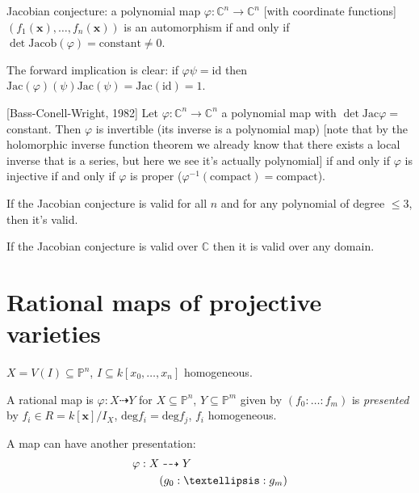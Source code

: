 \medskip\noindent
Jacobian conjecture:
a polynomial map $\varphi:\mathbb{C}^n \to
\mathbb{C}^n$
[with coordinate functions]
$(f_1(\mathbf{x}),…,f_n(\mathbf{x}))$
is an automorphism if and only if
$\det
\text{Jacob}(\varphi)=\text{constant}\neq
0$.

The forward implication is clear:
if  $\varphi \psi=\text{id}$
then
$\text{Jac}(\varphi)(\psi)\text{Jac}(\psi)=
\text{Jac}(\text{id})=1$.

[Bass-Conell-Wright, 1982]
Let $\varphi:\mathbb{C}^n \to \mathbb{C}^n$
a polynomial map with
$\det \text{Jac}\varphi=$ constant. Then
$\varphi$ is invertible (its inverse is a
polynomial map)
[note that by the holomorphic inverse
function theorem
we already know that there exists a local
inverse
that is a series, but here we see it's
actually polynomial]
if and only if $\varphi$ is injective
if and only if
$\varphi$ is proper
($\varphi^{-1}(\text{compact})=\text{compact}
$).

\begin{theorem}
\label{theorem-jacobian-conjecture}
If the Jacobian conjecture is valid for all
$n$ and
for any polynomial of degree $\leq 3$,
then it's valid.
\end{theorem}

\begin{theorem}
\label{theorem-jacobian-conjecture2}
If the Jacobian conjecture is valid over
$\mathbb{C}$
then it is valid over any domain.
\end{theorem}


\section{Rational maps of projective
varieties}
\label{section-ratio-maps-proje-varie}

\noindent
$X=V(I) \subseteq \mathbb{P}^n$,
$I \subseteq k[x_0,…,x_n]$ homogeneous.

\begin{definition}
\label{definition-presentation-of-map}
A rational map is $\varphi:X \dashrightarrow
Y$
for $X\subseteq \mathbb{P}^n$, $Y\subseteq
\mathbb{P}^m$
given by $(f_0:…:f_m)$
is {\it presented} by
$f_i \in R=k[\mathbf{x}]/I_X$,
$\text{deg}f_i=\text{deg}f_j$,
$f_i$ homogeneous.
\end{definition}

\noindent
A map can have another presentation:
$$
\begin{aligned}
\varphi:X &\dashrightarrow Y \\
\leavevmode &(g_0:…:g_m)
\end{aligned}
$$

